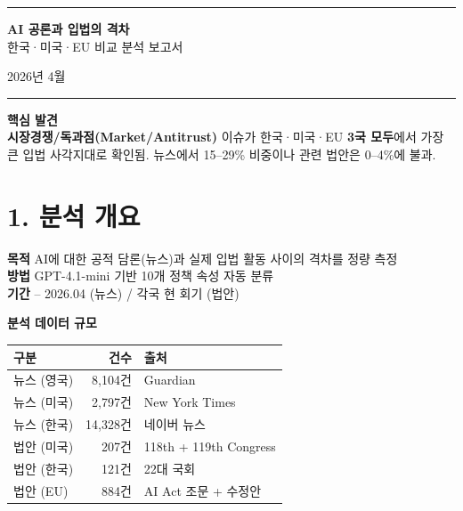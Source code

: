 \documentclass[11pt, a4paper]{article}
\begin{document}
\begin{center}
\vspace*{30mm}
{\color{headerblue}\rule{\textwidth}{2pt}}
\vspace{8mm}

{\Huge\bfseries AI 공론과 입법의 격차}\\[4mm]
{\Large 한국·미국·EU 비교 분석 보고서}

\vspace{10mm}
{\large 2026년 4월}

\vspace{8mm}
{\color{headerblue}\rule{\textwidth}{2pt}}

\vspace{40mm}
\begin{tcolorbox}[colback=boxblue, colframe=headerblue!50, width=0.85\textwidth]
\textbf{핵심 발견}\\[2mm]
\textbf{시장경쟁/독과점(Market/Antitrust)} 이슈가 한국·미국·EU \textbf{3국 모두}에서 가장 큰 입법 사각지대로 확인됨. 뉴스에서 15--29\% 비중이나 관련 법안은 0--4\%에 불과.
\end{tcolorbox}
\end{center}

\newpage

\section*{\color{headerblue}1. 분석 개요}

\begin{tcolorbox}[colback=lightgray, colframe=gray!50]
\textbf{목적} \quad AI에 대한 공적 담론(뉴스)과 실제 입법 활동 사이의 격차를 정량 측정\\
\textbf{방법} \quad GPT-4.1-mini 기반 10개 정책 속성 자동 분류\\
\textbf{기간}  -- 2026.04 (뉴스) / 각국 현 회기 (법안)
\end{tcolorbox}

\vspace{4mm}
\textbf{분석 데이터 규모}

\begin{table}[H]
\centering
\begin{tabular}{lrl}
\toprule
\textbf{구분} & \textbf{건수} & \textbf{출처} \\
\midrule
뉴스 (영국) & 8,104건 & Guardian \\
뉴스 (미국) & 2,797건 & New York Times \\
뉴스 (한국) & 14,328건 & 네이버 뉴스 \\
\midrule
법안 (미국) & 207건 & 118th + 119th Congress \\
법안 (한국) & 121건 & 22대 국회 \\
법안 (EU) & 884건 & AI Act 조문 + 수정안 \\
\bottomrule
\end{tabular}
\end{table}
\end{document}
